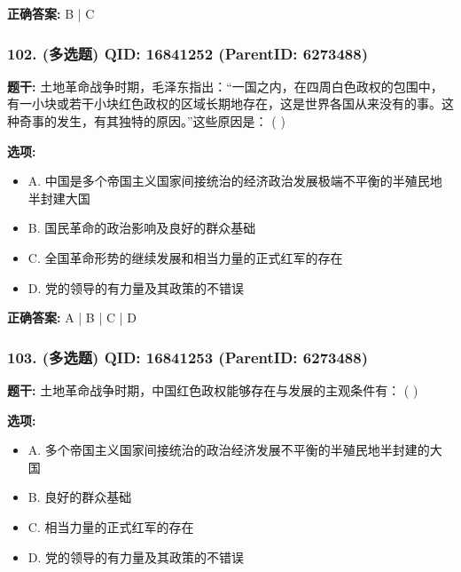 \documentclass[12pt,UTF8]{ctexart}
\begin{document}
\textbf{正确答案:}
B | C

\vspace{0.3em}\hrulefill\vspace{0.7em}

\subsubsection*{102. (多选题) \small QID: 16841252 (ParentID: 6273488)}

\textbf{题干:}
土地革命战争时期，毛泽东指出：“一国之内，在四周白色政权的包围中，有一小块或若干小块红色政权的区域长期地存在，这是世界各国从来没有的事。这种奇事的发生，有其独特的原因。”这些原因是： ( )



\textbf{选项:}
\begin{itemize}[leftmargin=*]

  \item A. 中国是多个帝国主义国家间接统治的经济政治发展极端不平衡的半殖民地半封建大国

  \item B. 国民革命的政治影响及良好的群众基础

  \item C. 全国革命形势的继续发展和相当力量的正式红军的存在

  \item D. 党的领导的有力量及其政策的不错误

\end{itemize}

\textbf{正确答案:}
A | B | C | D

\vspace{0.3em}\hrulefill\vspace{0.7em}

\subsubsection*{103. (多选题) \small QID: 16841253 (ParentID: 6273488)}

\textbf{题干:}
土地革命战争时期，中国红色政权能够存在与发展的主观条件有： ( )



\textbf{选项:}
\begin{itemize}[leftmargin=*]

  \item A. 多个帝国主义国家间接统治的政治经济发展不平衡的半殖民地半封建的大国

  \item B. 良好的群众基础

  \item C. 相当力量的正式红军的存在

  \item D. 党的领导的有力量及其政策的不错误

\end{itemize}
\end{document}
